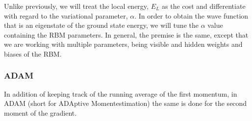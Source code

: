 Unlike previously, we will treat the local energy, $E_L$ as the cost and differentiate with regard to the variational parameter, $\alpha$. In order to obtain the wave function that is an eigenstate of the ground state energy, we will tune the $\alpha$ value containing the RBM parameters. In general, the premise is the same, except that we are working with multiple parameters, being visible and hidden weights and biases of the RBM.  

\subsubsection{ADAM}
In addition of keeping track of the running average of the first momentum, in ADAM (short for ADAptive Momentestimation) the same is done for the second moment of the gradient. 